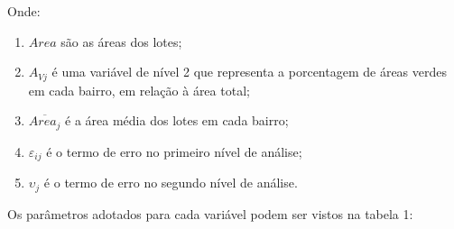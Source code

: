 \documentclass[
  a4paper, 11pt]{article}
\providecommand{\tightlist}{%
  \setlength{\itemsep}{0pt}\setlength{\parskip}{0pt}}
\begin{document}
Onde:

\begin{enumerate}
\def\labelenumi{\arabic{enumi}.}
\tightlist
\item
  \(Area\) são as áreas dos lotes;
\item
  \(A_{Vj}\) é uma variável de nível 2 que representa a porcentagem de
  áreas verdes em cada bairro, em relação à área total;
\item
  \(\overline{Area_j}\) é a área média dos lotes em cada bairro;
\item
  \(\varepsilon_{ij}\) é o termo de erro no primeiro nível de análise;
\item
  \(\upsilon_j\) é o termo de erro no segundo nível de análise.
\end{enumerate}

Os parâmetros adotados para cada variável podem ser vistos na tabela 1:
\end{document}
